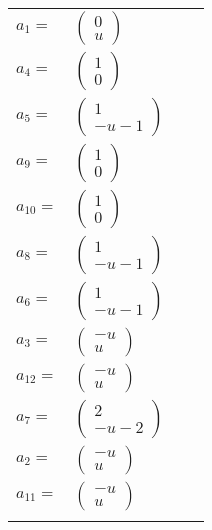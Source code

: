 \documentclass[1p]{elsarticle_modified}
\theoremstyle{definition}
\begin{document}
\begin{tabular}{m{7pt} m{180pt} m{7pt} m{180pt} }
\flushright $a_{1}=$&$\begin{pmatrix}0\\u\end{pmatrix}$ \\
\flushright $a_{4}=$&$\begin{pmatrix}1\\0\end{pmatrix}$ \\
\flushright $a_{5}=$&$\begin{pmatrix}1\\- u-1\end{pmatrix}$ \\
\flushright $a_{9}=$&$\begin{pmatrix}1\\0\end{pmatrix}$ \\
\flushright $a_{10}=$&$\begin{pmatrix}1\\0\end{pmatrix}$ \\
\flushright $a_{8}=$&$\begin{pmatrix}1\\- u-1\end{pmatrix}$ \\
\flushright $a_{6}=$&$\begin{pmatrix}1\\- u-1\end{pmatrix}$ \\
\flushright $a_{3}=$&$\begin{pmatrix}- u\\u\end{pmatrix}$ \\
\flushright $a_{12}=$&$\begin{pmatrix}- u\\u\end{pmatrix}$ \\
\flushright $a_{7}=$&$\begin{pmatrix}2\\- u-2\end{pmatrix}$ \\
\flushright $a_{2}=$&$\begin{pmatrix}- u\\u\end{pmatrix}$ \\
\flushright $a_{11}=$&$\begin{pmatrix}- u\\u\end{pmatrix}$\\&\end{tabular}
\end{document}
